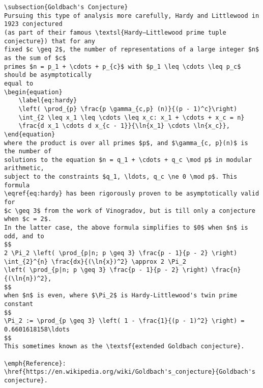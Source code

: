 \begin{verbatim}
\subsection{Goldbach's Conjecture}
Pursuing this type of analysis more carefully, Hardy and Littlewood in 1923 conjectured
(as part of their famous \textsl{Hardy–Littlewood prime tuple conjecture}) that for any
fixed $c \geq 2$, the number of representations of a large integer $n$ as the sum of $c$
primes $n = p_1 + \cdots + p_{c}$ with $p_1 \leq \cdots \leq p_c$ should be asymptotically
equal to
\begin{equation}
    \label{eq:hardy}
    \left( \prod_{p} \frac{p \gamma_{c,p} (n)}{(p - 1)^c}\right)
    \int_{2 \leq x_1 \leq \cdots \leq x_c: x_1 + \cdots + x_c = n}
    \frac{d x_1 \cdots d x_{c - 1}}{\ln{x_1} \cdots \ln{x_c}},
\end{equation}
where the product is over all primes $p$, and $\gamma_{c, p}(n)$ is the number of
solutions to the equation $n = q_1 + \cdots + q_c \mod p$ in modular arithmetic,
subject to the constraints $q_1, \ldots, q_c \ne 0 \mod p$. This formula
\eqref{eq:hardy} has been rigorously proven to be asymptotically valid for
$c \geq 3$ from the work of Vinogradov, but is till only a conjecture when $c = 2$.
In the latter case, the above formula simplifies to $0$ when $n$ is odd, and to
$$
2 \Pi_2 \left( \prod_{p|n; p \geq 3} \frac{p - 1}{p - 2} \right)
\int_{2}^{n} \frac{dx}{(\ln{x})^2} \approx 2 \Pi_2
\left( \prod_{p|n; p \geq 3} \frac{p - 1}{p - 2} \right) \frac{n}{(\ln{n})^2},
$$
when $n$ is even, where $\Pi_2$ is Hardy-Littlewood's twin prime constant
$$
\Pi_2 := \prod_{p \geq 3} \left( 1 - \frac{1}{(p - 1)^2} \right) = 0.6601618158\ldots
$$
This sometimes known as the \textsf{extended Goldbach conjecture}.

\emph{Reference}: \href{https://en.wikipedia.org/wiki/Goldbach's_conjecture}{Goldbach's conjecture}.
\end{verbatim}
